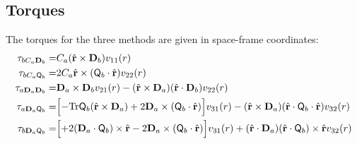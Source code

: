 %
\subsection{Torques}

%
The torques for the three methods are given in space-frame
coordinates:
%
%
\begin{align}
\mathbf{\tau}_{b C_a \mathbf{D}_b} =& 
C_a  (\hat{\mathbf{r}} \times  \mathbf{D}_b) v_{11}(r) \\
%
%
%
\mathbf{\tau}_{b C_a \mathsf{Q}_b} =&
2C_a
\hat{\mathbf{r}} \times ( \mathsf{Q}_b \cdot \hat{\mathbf{r}}) v_{22}(r) \\
%
%
%
%
%
%
\mathbf{\tau}_{a \mathbf{D}_a \mathbf{D}_b} =&
 \mathbf{D}_a  \times \mathbf{D}_b v_{21}(r)
-
(\hat{\mathbf{r}} \times \mathbf{D}_a )
(\hat{\mathbf{r}} \cdot \mathbf{D}_b )  v_{22}(r)\\
%
%
%
%
%
%
\mathbf{\tau}_{a \mathbf{D}_a \mathsf{Q}_b} =& 
 \Bigl[
-\text{Tr}\mathsf{Q}_b
(\hat{\mathbf{r}} \times \mathbf{D}_a )
+2 \mathbf{D}_a  \times 
(\mathsf{Q}_b \cdot \hat{\mathbf{r}})
\Bigr] v_{31}(r)
- (\hat{\mathbf{r}} \times \mathbf{D}_a )
(\hat{\mathbf{r}} \cdot \mathsf{Q}_b \cdot \hat{\mathbf{r}}) v_{32}(r)\\
%
%
%
\mathbf{\tau}_{b \mathbf{D}_a \mathsf{Q}_b} =&
 \Bigl[
+2 ( \mathbf{D}_a \cdot \mathsf{Q}_b ) \times
\hat{\mathbf{r}} 
-2 \mathbf{D}_a  \times 
(\mathsf{Q}_b \cdot \hat{\mathbf{r}})
\Bigr] v_{31}(r)
+
(\hat{\mathbf{r}} \cdot \mathbf{D}_a)
(\hat{\mathbf{r}} \cdot \mathsf{Q}_b) \times \hat{\mathbf{r}} v_{32}(r)\\
%
%
%

\end{align}
